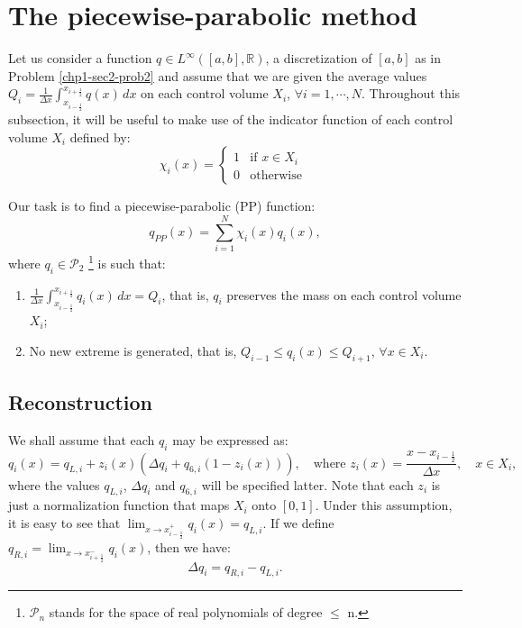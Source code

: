 \citep{colella:1984}
\citep{carpenter:1990} 
\citep{vanleer:1977}
\citep{lin:1994}
\citep{lin:1996}

\section{The piecewise-parabolic method}
\label{chp1-sec-ppm}

Let us consider a function ${q} \in L^{\infty}([a, b],\mathbb{R})$, a discretization of
$[a,b]$ as in Problem \ref{chp1-sec2-prob2}
and assume that we are given the average values ${Q}_i = \frac{1}{\Delta x} 
\int_{x_{i-\frac{1}{2}}}^{x_{i+\frac{1}{2}}} {q}(x) \,dx$
on each control volume $X_i$, $\forall i = 1, \cdots, N $.
Throughout this subsection, it will be useful to make use of the indicator function of
each control volume $X_i$ defined by:
\begin{equation}
	\label{chp1-sec3-1-eq1}
	\chi_{i}(x)=
	\begin{cases}
		1 & \text{if } x \in X_i\\
		0 & \text{otherwise }
	\end{cases}
\end{equation}

Our task is to find a piecewise-parabolic (PP) 
function:
\begin{equation}
	\label{chp1-sec3-1-eq2}
	q_{PP}(x) = \sum_{i=1}^{N} \chi_i(x) q_i(x),
\end{equation}
where ${q}_i \in \mathcal{P}_2$
\footnote{$\mathcal{P}_n$ stands for the space of real polynomials of degree $\leq$ n.} 
is such that:
\begin{enumerate}
	\item $\frac{1}{\Delta x}\int_{x_{i-\frac{1}{2}}}^{x_{i+\frac{1}{2}}} {q}_i(x) \,dx = {Q}_i$,
	that is, $q_i$ preserves the mass on each control volume $X_i$;
	\item No new extreme is generated, that is, 
	${Q}_{i-1} \leq q_i(x) \leq {Q}_{i+1}$, $\forall x \in X_i$.
\end{enumerate}

\subsection{Reconstruction}
\label{chp1-sec-recon}

We shall assume that each $q_i$ may be expressed as:
\begin{equation}
	\label{chp1-sec-recon-ppm-eq1}
	q_i(x) = q_{L, i} + z_i(x)(\Delta q_i + q_{6, i}(1-z_i(x))), 
	\quad \text{where }
	z_i(x) = \frac{x-x_{i-\frac{1}{2}}}{\Delta x},
	\quad x \in X_i,
\end{equation}
where the values $q_{L, i}$, $\Delta q_i$ and $q_{6, i}$  will be specified latter.
Note that each $z_i$ is just a normalization function that maps $X_i$ onto $[0,1]$.
Under this assumption, it is easy to see that 
$\lim_{x \to x_{i-\frac{1}{2}}^+} {q_i(x)} = q_{L, i}$.
If we define $q_{R, i} = \lim_{x \to x_{i+\frac{1}{2}}^-} {q_i(x)}$,
then we have:
\begin{equation}
	\label{chp1-sec-recon-ppm-eq2}
	\Delta q_i = q_{R, i} - q_{L, i}.
\end{equation}

